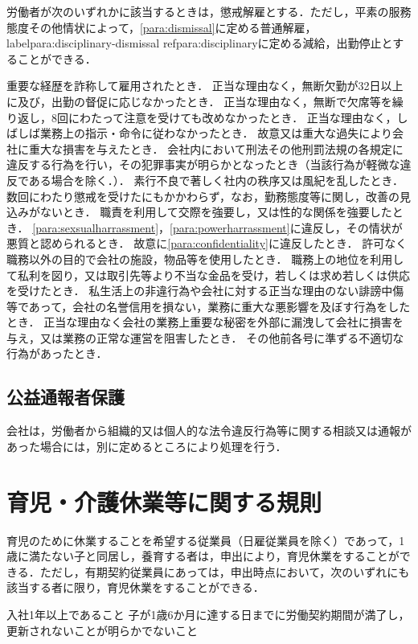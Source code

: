 \documentclass[11pt,a4paper]{jsarticle}
\begin{document}
\term
労働者が次のいずれかに該当するときは，懲戒解雇とする．ただし，平素の服務態度その他情状によって，\ref{para:dismissal}に定める普通解雇，\\label{para:disciplinary-dismissal}
ref{para:disciplinary}に定める減給，出勤停止とすることができる．
\begin{enumerate}
	\itm 重要な経歴を詐称して雇用されたとき．
	\itm 正当な理由なく，無断欠勤が32日以上に及び，出勤の督促に応じなかったとき．
	\itm 正当な理由なく，無断で欠席等を繰り返し，8回にわたって注意を受けても改めなかったとき．
	\itm 正当な理由なく，しばしば業務上の指示・命令に従わなかったとき．
	\itm 故意又は重大な過失により会社に重大な損害を与えたとき．
	\itm 会社内において刑法その他刑罰法規の各規定に違反する行為を行い，その犯罪事実が明らかとなったとき（当該行為が軽微な違反である場合を除く．）．
	\itm 素行不良で著しく社内の秩序又は風紀を乱したとき．
	\itm 数回にわたり懲戒を受けたにもかかわらず，なお，勤務態度等に関し，改善の見込みがないとき．
	\itm 職責を利用して交際を強要し，又は性的な関係を強要したとき．
	\itm \ref{para:sexsualharrassment}，\ref{para:powerharrassment}に違反し，その情状が悪質と認められるとき．
	\itm 故意に\ref{para:confidentiality}に違反したとき．
	\itm 許可なく職務以外の目的で会社の施設，物品等を使用したとき．
	\itm 職務上の地位を利用して私利を図り，又は取引先等より不当な金品を受け，若しくは求め若しくは供応を受けたとき．
	\itm 私生活上の非違行為や会社に対する正当な理由のない誹謗中傷等であって，会社の名誉信用を損ない，業務に重大な悪影響を及ぼす行為をしたとき．
	\itm 正当な理由なく会社の業務上重要な秘密を外部に漏洩して会社に損害を与え，又は業務の正常な運営を阻害したとき．
	\itm その他前各号に準ずる不適切な行為があったとき．
\end{enumerate}
\subsection{公益通報者保護}
会社は，労働者から組織的又は個人的な法令違反行為等に関する相談又は通報があった場合には，別に定めるところにより処理を行う．





\clearpage
\section{育児・介護休業等に関する規則}
育児のために休業することを希望する従業員（日雇従業員を除く）であって，1歳に満たない子と同居し，養育する者は，申出により，育児休業をすることができる．ただし，有期契約従業員にあっては，申出時点において，次のいずれにも該当する者に限り，育児休業をすることができる．
\label{para:ChildcareLayoff}
\begin{enumerate}
	\itm 入社1年以上であること
	\itm 子が1歳6か月に達する日までに労働契約期間が満了し，更新されないことが明らかでないこと
\end{enumerate}
\end{document}
